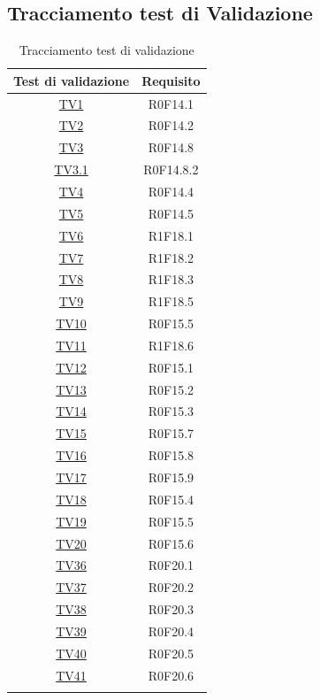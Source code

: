 \documentclass[../PianoDiQualifica.tex]{subfiles}
\begin{document}
\subsection{Tracciamento test di Validazione}
\normalsize
\begin{longtable}{|c|c|}
	\hline
	\textbf{Test di validazione} & \textbf{Requisito}\\
	\hline
	\endhead
	\hyperlink{TV1}{TV1} & R0F14.1  \\
	\hline
	\hyperlink{TV2}{TV2} & R0F14.2  \\
	\hline
	\hyperlink{TV3}{TV3} & R0F14.8   \\
	\hline
	\hyperlink{TV3.1}{TV3.1} & R0F14.8.2   \\
	\hline
	\hyperlink{TV4}{TV4} & R0F14.4   \\
	\hline
	\hyperlink{TV5}{TV5} & R0F14.5   \\
	\hline
	\hyperlink{TV6}{TV6} & R1F18.1   \\
	\hline
	\hyperlink{TV7}{TV7} & R1F18.2   \\
	\hline
	\hyperlink{TV8}{TV8} & R1F18.3   \\
	\hline
	\hyperlink{TV9}{TV9} & R1F18.5   \\
	\hline
	\hyperlink{TV10}{TV10} & R0F15.5   \\
	\hline
	\hyperlink{TV11}{TV11} & R1F18.6   \\
	\hline
	\hyperlink{TV12}{TV12} & R0F15.1   \\
	\hline
	\hyperlink{TV13}{TV13} & R0F15.2   \\
	\hline
	\hyperlink{TV14}{TV14} & R0F15.3   \\
	\hline
	\hyperlink{TV15}{TV15} & R0F15.7   \\
	\hline
	\hyperlink{TV16}{TV16} & R0F15.8   \\
	\hline
	\hyperlink{TV17}{TV17} & R0F15.9   \\
	\hline
	\hyperlink{TV18}{TV18} & R0F15.4   \\
	\hline
	\hyperlink{TV19}{TV19} & R0F15.5   \\
	\hline
	\hyperlink{TV20}{TV20} & R0F15.6   \\
	\hline
	\hyperlink{TV36}{TV36} & R0F20.1   \\
	\hline
	\hyperlink{TV37}{TV37} & R0F20.2   \\
	\hline
	\hyperlink{TV38}{TV38} & R0F20.3   \\
	\hline
	\hyperlink{TV39}{TV39} & R0F20.4   \\
	\hline
	\hyperlink{TV40}{TV40} & R0F20.5   \\
	\hline
	\hyperlink{TV41}{TV41} & R0F20.6  \\
	\hline
	\caption[Tracciamento test di validazione]{Tracciamento test di validazione}
	\label{tabella:TracciamentoTestValidazione}
\end{longtable}
\end{document}
